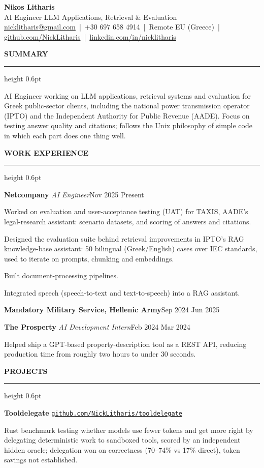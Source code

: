 \documentclass[11pt,a4paper]{article}
\newcommand{\cvsection}[1]{%
  \par\vspace{7.0pt}%
  {\headingfont\bfseries\MakeUppercase{#1}}\par
  \vspace{2.2pt}%
  \hrule height 0.6pt%
  \vspace{7.1pt}%
}
\newcommand{\cvitem}[1]{%
  \par\vspace{1.2pt}%
  \noindent\hangindent=10.46pt\hangafter=1
  \hspace*{-2.3pt}\textbullet\hspace*{9.1pt}#1%
  \par
}
\newcommand{\entry}[3]{%
  \noindent\textbf{#1} \textemdash{} \textit{#2}\hfill #3\par\vspace{2.0pt}%
}
\newcommand{\plainentry}[2]{%
  \par\noindent\textbf{#1}\hfill #2\par
}
\newcommand{\project}[2]{%
  \par\vspace{0.5pt}%
  \noindent\textbf{#1} \textemdash{} \href{https://#2}{\texttt{#2}}\par
}
\begin{document}
\begin{center}
  {\LARGE\bfseries Nikos Litharis}\\[3pt]
  {\small AI Engineer \textemdash{} LLM Applications, Retrieval \& Evaluation}\\[4pt]
  {\footnotesize
    \href{mailto:nicklitharis@gmail.com}{nicklitharis@gmail.com} \,|\, +30 697 658 4914 \,|\,
    Remote \textemdash{} EU (Greece) \,|\, \href{https://github.com/NickLitharis}{github.com/NickLitharis} \,|\,
    \href{https://linkedin.com/in/nicklitharis}{linkedin.com/in/nicklitharis}}
\end{center}

\vspace{-10pt}

\cvsection{Summary}
AI Engineer working on LLM applications, retrieval systems and evaluation for Greek public-sector clients, including the national power transmission operator (IPTO) and the Independent Authority for Public Revenue (AADE). Focus on testing answer quality and citations; follows the Unix philosophy of simple code in which each part does one thing well.

\cvsection{Work Experience}
\entry{Netcompany}{AI Engineer}{Nov 2025 \textendash{} Present}
\cvitem{Worked on evaluation and user-acceptance testing (UAT) for TAXIS, AADE's legal-research assistant: scenario datasets, and scoring of answers and citations.}
\cvitem{Designed the evaluation suite behind retrieval improvements in IPTO's RAG knowledge-base assistant: 50 bilingual (Greek/English) cases over IEC standards, used to iterate on prompts, chunking and embeddings.}
\cvitem{Built document-processing pipelines.}
\cvitem{Integrated speech (speech-to-text and text-to-speech) into a RAG assistant.}

\vspace{4.5pt}\plainentry{Mandatory Military Service, Hellenic Army}{Sep 2024 \textendash{} Jun 2025}

\vspace{4.0pt}\entry{The Prosperty}{AI Development Intern}{Feb 2024 \textendash{} Mar 2024}
\cvitem{Helped ship a GPT-based property-description tool as a REST API, reducing production time from roughly two hours to under 30 seconds.}

\cvsection{Projects}
\project{Tooldelegate}{github.com/NickLitharis/tooldelegate}
Rust benchmark testing whether models use fewer tokens and get more right by delegating deterministic work to sandboxed tools, scored by an independent hidden oracle; delegation won on correctness (70--74\% vs 17\% direct), token savings not established.
\end{document}
